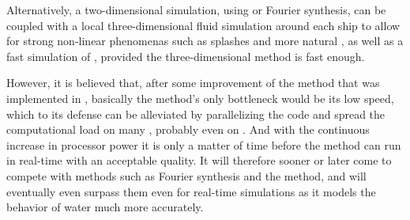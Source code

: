 Alternatively, a two-dimensional simulation, using \LPD or Fourier synthesis, can be coupled with a local three-dimensional fluid simulation around each ship to allow for strong non-linear phenomenas such as splashes and more natural \FSI, as well as a fast simulation of , provided the three-dimensional method is fast enough.

However, it is believed that, after some improvement of the method that was implemented in \thisprojectwork, basically the method's only bottleneck would be its low speed, which to its defense can be alleviated by parallelizing the code and spread the computational load on many \CPUs, probably even on \GPUs. And with the continuous increase in processor power it is only a matter of time before the method can run in real-time with an acceptable quality. It will therefore sooner or later come to compete with methods such as Fourier synthesis and the \LPD method, and will eventually even surpass them even for real-time simulations as it models the behavior of water much more accurately.